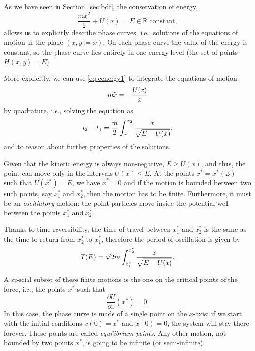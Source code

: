 \documentclass[english,fontsize=11pt,paper=a5,oneside]{scrbook}
\newcommand{\R}{\mathbb{R}}
\let\d\relax
\DeclareMathOperator{\d}{d}
\theoremstyle{definition}
\begin{document}
As we have seen in Section~\ref{sec:bdf}, the conservation of energy,
\begin{equation}\label{eq:cenergy1}
    \frac{m \dot x^2}{2} + U(x) = E \in\R \mbox{ constant},
\end{equation}
allows us to explicitly describe phase curves, i.e., solutions of the equations of motion in the plane $(x, y := \dot x)$.
On each phase curve the value of the energy is constant, so the phase curve lies entirely in one energy level (the set of points $H(x,y)=E$).

More explicitly, we can use \eqref{eq:cenergy1} to integrate the equations of motion
\begin{equation}
    m \ddot x = - \frac{\d U(x)}{\d x}
\end{equation}
by quadrature, i.e., solving the equation as
\begin{equation}
    t_2 - t_1 = \frac m2 \int_{x_1}^{x_2} \frac{\d x}{\sqrt{E-U(x)}},
\end{equation}
and to reason about further properties of the solutions.

Given that the kinetic energy is always non-negative, $E \geq U(x)$, and thus, the point can move only in the intervals $U(x) \leq E$.
At the points $x^* = x^*(E)$ such that $U(x^*) = E$, we have $\dot x^* = 0$ and if the motion is bounded between two such points, say $x_1^*$ and $x_2^*$, then the motion has to be finite.
Furthermore, it must be an \emph{oscillatory} motion: the point particles move inside the potential well between the points $x_1^*$ and $x_2^*$.

Thanks to time reversibility, the time of travel between $x_1^*$ and $x_2^*$ is the same as the time to return from $x_2^*$ to $x_1^*$, therefore the period of oscillation is given by
\begin{equation}\label{eq:osc}
    T(E) = \sqrt{2m} \int_{x^*_1}^{x^*_2} \frac{\d x}{\sqrt{E-U(x)}}.
\end{equation}

A special subset of these finite motions is the one on the critical points of the force, i.e., the points $x^*$ such that 
\begin{equation}
    \frac{\partial U}{\partial x}(x^*) = 0.
\end{equation}
In this case, the phase curve is made of a single point on the $x$-axis: if we start with the initial conditions $x(0) = x^*$ and $\dot x(0) = 0$, the system will stay there forever. These points are called \emph{equilibrium points}.
%
Any other motion, not bounded by two points $x^*$, is going to be infinite (or semi-infinite).
\end{document}
